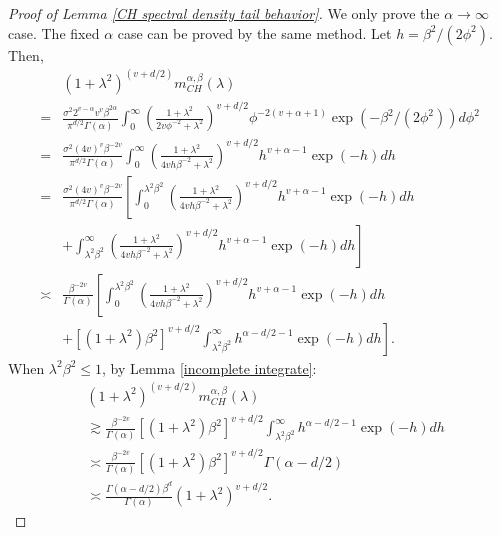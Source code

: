\documentclass[10pt,a4paper]{amsart}
\begin{document}
\begin{proof}[Proof of Lemma \ref{CH spectral density tail behavior}] 
We only prove the $\alpha \to \infty$ case. The fixed $\alpha$ case can be proved by the same method. Let $ h=\beta^2/(2\phi^2)$. Then,
\begin{equation}\label{spectral density expansion}
\begin{split}
&(1+\lambda^2)^{(v+d/2)}m^{\alpha,\beta}_{CH}(\lambda) \\
=&  \frac{\sigma^2 2^{v-\alpha} v^v \beta^{2\alpha}}{\pi^{d/2}\Gamma(\alpha)}\int_0^{\infty} \left(\frac{1+\lambda^2}{2v\phi^{-2}+\lambda^2}\right)^{v+d/2}  \phi^{-2(v+\alpha+1)} \exp{(-\beta^2/(2\phi^2))d\phi^2}  \\
=&  \frac{\sigma^2  {(4v)}^v \beta^{-2v}}{\pi^{d/2}\Gamma(\alpha)}\int_0^{\infty} \left(\frac{1+\lambda^{2}}{4vh \beta^{-2}+\lambda^{2}}\right)^{v+d/2}  h^{v+\alpha-1} \exp(-h) dh\\
=&  \frac{\sigma^2  {(4v)}^v \beta^{-2v}}{\pi^{d/2}\Gamma(\alpha)} \left[\int_0^{\lambda^2\beta^2} \left(\frac{1+\lambda^{2}}{4vh \beta^{-2}+\lambda^{2}}\right)^{v+d/2}  h^{v+\alpha-1} \exp(-h) dh\right.
\\
&+\left.\int_{\lambda^2\beta^2}^{\infty} \left(\frac{1+\lambda^{2}}{4vh \beta^{-2}
+\lambda^{2}}\right)^{v+d/2}  h^{v+\alpha-1} \exp(-h) dh \right]\\
\asymp& \frac{\beta^{-2v}}{\Gamma(\alpha)} \left[\int_0^{\lambda^2\beta^2} \left(\frac{1+\lambda^{2}}{4vh \beta^{-2}+\lambda^{2}}\right)^{v+d/2}  h^{v+\alpha-1} \exp(-h) dh\right.
\\
&+\left.[(1+\lambda^{2})\beta^{2}]^{v+d/2}\int_{\lambda^2\beta^2}^{\infty} h^{\alpha-d/2-1} \exp(-h) dh \right].
\end{split}
\end{equation}
When $\lambda^2 \beta^{2}\leq 1$, by Lemma \ref{incomplete integrate}:
\begin{displaymath}
\begin{split}
&(1+\lambda^2)^{(v+d/2)}m^{\alpha,\beta}_{CH}(\lambda) \\
&\gtrsim \frac{\beta^{-2v}}{\Gamma(\alpha)} [(1+\lambda^{2})\beta^{2}]^{v+d/2}\int_{\lambda^2\beta^2}^{\infty} h^{\alpha-d/2-1} \exp(-h) dh \\
&\asymp \frac{\beta^{-2v}}{\Gamma(\alpha)}[(1+\lambda^{2})\beta^{2}]^{v+d/2} \Gamma(\alpha-d/2)\\
&\asymp \frac{\Gamma(\alpha-d/2)\beta^{d}}{\Gamma(\alpha)}(1+\lambda^{2})^{v+d/2}. 
\end{split}
\end{displaymath}

\end{proof}
\end{document}
